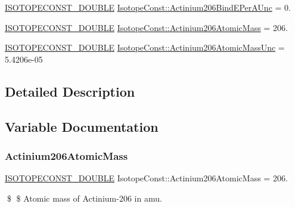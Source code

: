 \begin{DoxyCompactItemize}
\mbox{\hyperlink{group___isotope_const-_macros_ga8f45a7272ce02c0b4c65c44636ed719a}{I\+S\+O\+T\+O\+P\+E\+C\+O\+N\+S\+T\+\_\+\+D\+O\+U\+B\+LE}} \mbox{\hyperlink{group___isotope_const-_actinium-_ac206_gad076217d21b18517a7858fe7aaf35828}{Isotope\+Const\+::\+Actinium206\+Bind\+E\+Per\+A\+Unc}} = 0.
\item 
\mbox{\hyperlink{group___isotope_const-_macros_ga8f45a7272ce02c0b4c65c44636ed719a}{I\+S\+O\+T\+O\+P\+E\+C\+O\+N\+S\+T\+\_\+\+D\+O\+U\+B\+LE}} \mbox{\hyperlink{group___isotope_const-_actinium-_ac206_ga0461368998049e99973b51fd4bfe15b6}{Isotope\+Const\+::\+Actinium206\+Atomic\+Mass}} = 206.
\item 
\mbox{\hyperlink{group___isotope_const-_macros_ga8f45a7272ce02c0b4c65c44636ed719a}{I\+S\+O\+T\+O\+P\+E\+C\+O\+N\+S\+T\+\_\+\+D\+O\+U\+B\+LE}} \mbox{\hyperlink{group___isotope_const-_actinium-_ac206_gaca50a279e08b874e3ab616b1f5b5db69}{Isotope\+Const\+::\+Actinium206\+Atomic\+Mass\+Unc}} = 5.\+4206e-\/05
\end{DoxyCompactItemize}


\subsection{Detailed Description}


\subsection{Variable Documentation}
\mbox{\label{group___isotope_const-_actinium-_ac206_ga0461368998049e99973b51fd4bfe15b6}} 
\subsubsection{\texorpdfstring{Actinium206\+Atomic\+Mass}{Actinium206AtomicMass}}
{\footnotesize\ttfamily \mbox{\hyperlink{group___isotope_const-_macros_ga8f45a7272ce02c0b4c65c44636ed719a}{I\+S\+O\+T\+O\+P\+E\+C\+O\+N\+S\+T\+\_\+\+D\+O\+U\+B\+LE}} Isotope\+Const\+::\+Actinium206\+Atomic\+Mass = 206.}

\$ \$ Atomic mass of Actinium-\/206 in amu. \mbox{\label{group___isotope_const-_actinium-_ac206_gaca50a279e08b874e3ab616b1f5b5db69}} 
